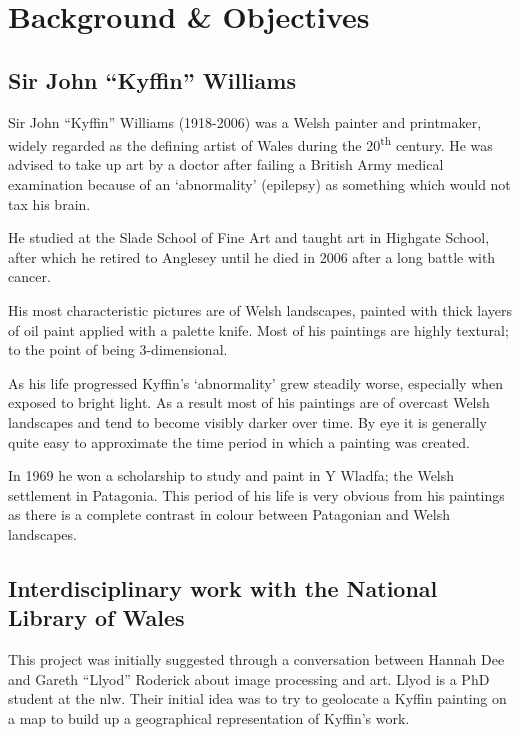 \chapter{Background \& Objectives}


\section{Sir John ``Kyffin'' Williams}

Sir John ``Kyffin'' Williams (1918-2006) was a Welsh painter and printmaker, widely regarded as 
the defining artist of Wales during the 20\textsuperscript{th} century\cite{Davies2008Welsh}. He was advised to take up
art by a doctor after failing a British Army medical examination because of an `abnormality' 
(epilepsy) as something which would not tax his brain.

He studied at the Slade School of Fine Art and taught art in Highgate School, after which he 
retired to Anglesey until he died in 2006 after a long battle with cancer.

His most characteristic pictures are of Welsh landscapes, painted with thick layers of oil paint
applied with a palette knife\cite{Chilvers2009Dictionary}. Most of his paintings are highly textural; to the point of being
3-dimensional.

As his life progressed Kyffin's `abnormality' grew steadily worse, especially when exposed to 
bright light. As a result most of his paintings are of overcast Welsh landscapes and tend to 
become visibly darker over time\cite{Harris2011How}. By eye it is generally quite easy to approximate the time period
in which a painting was created.

In 1969 he won a scholarship to study and paint in Y Wladfa; the Welsh settlement in Patagonia.
This period of his life is very obvious from his paintings as there is a complete contrast in 
colour between Patagonian and Welsh landscapes.


\section{Interdisciplinary work with the National Library of Wales}

This project was initially suggested through a conversation between Hannah Dee and Gareth ``Llyod''
Roderick about image processing and art. Llyod is a PhD student at the \gls{nlw}.
Their initial idea was to try to geolocate a Kyffin painting on a map to build up a geographical 
representation of Kyffin's work.

